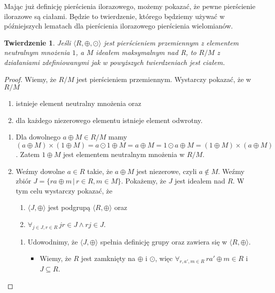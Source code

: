 \documentclass[declaration,shortabstract]{iithesis}
\theoremstyle{definition}
\theoremstyle{remark} \newtheorem{observation}{Obserwacja}
\theoremstyle{plain} \newtheorem{theorem}{Twierdzenie}
\theoremstyle{plain} \newtheorem{lemma}{Lemat}
\theoremstyle{remark} \newtheorem*{remark*}{Uwaga}
\theoremstyle{reminder} \newtheorem*{reminder*}{Przypomnienie}
\begin{document}
Mając już definicję pierścienia ilorazowego, możemy pokazać, że pewne pierścienie ilorazowe są ciałami. Będzie to twierdzenie, którego będziemy używać w późniejszych lematach dla pierścienia ilorazowego pierścienia wielomianów.

\theoremstyle{theorem}
\begin{theorem}\label{pier_ilo_cialem0}
	Jeśli $\langle R, \oplus, \odot \rangle$ jest pierścieniem przemiennym z elementem neutralnym mnożenia $1$, a $M$ ideałem maksymalnym nad R, to $R/M$ z działaniami zdefiniowanymi jak w powyższych twierdzeniach jest ciałem.
\end{theorem}

\begin{proof}
	Wiemy, że $R/M$ jest pierścieniem przemiennym. Wystarczy pokazać, że w $R/M$
	\begin{enumerate}[label=\arabic*.,leftmargin=.4in]
		\item istnieje element neutralny mnożenia oraz 
		\item dla każdego niezerowego elementu istnieje element odwrotny.
	\end{enumerate}
	\begin{enumerate}[label=Ad.\arabic*.,leftmargin=.4in]
		\item Dla dowolnego $a \oplus M \in R/M$ mamy
		      $(a \oplus M) \times (1 \oplus M) = a \odot 1 \oplus M = a \oplus M = 1 \odot a \oplus M = (1 \oplus M) \times (a \oplus M)$. Zatem $1 \oplus M$ jest elementem neutralnym mnożenia w $R/M$.
		\item Weźmy dowolne $a \in R$ takie, że $a \oplus M$ jest niezerowe, czyli $a \notin M$. Weźmy zbiór $J = \{ra \oplus m \, | \, r \in R, m \in M\}$. Pokażemy, że $J$ jest ideałem nad $R$. W tym celu wystarczy pokazać, że 
		      \begin{enumerate}[label=2.\arabic*.]
		      	\item $\langle J, \oplus \rangle$ jest podgrupą $\langle R, \oplus \rangle$ oraz 
		      	\item $\forall_{j \in J, r \in R} \, jr \in J \wedge rj \in J$.
		      \end{enumerate}
		      \begin{enumerate}[label=Ad.2.\arabic*.]
		      	\item Udowodnimy, że $\langle J, \oplus \rangle$ spełnia definicję grupy oraz zawiera się w $\langle R, \oplus \rangle$.
		      	      \begin{itemize}
		      	      	\item Wiemy, że $R$ jest zamknięty na $\oplus$ i $\odot$, więc $\forall_{r, a', m \in R} \, ra' \oplus m \in R$ i $J \subseteq R$. 

\end{itemize}
\end{enumerate}
\end{enumerate}
\end{proof}
\end{document}
